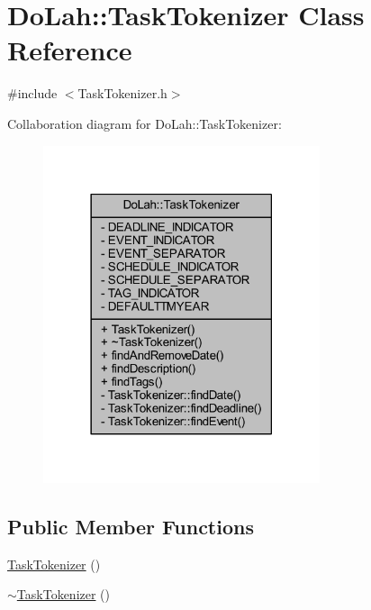 \hypertarget{class_do_lah_1_1_task_tokenizer}{}\section{Do\+Lah\+:\+:Task\+Tokenizer Class Reference}
\label{class_do_lah_1_1_task_tokenizer}


{\ttfamily \#include $<$Task\+Tokenizer.\+h$>$}



Collaboration diagram for Do\+Lah\+:\+:Task\+Tokenizer\+:
\nopagebreak
\begin{figure}[H]
\begin{center}
\leavevmode
\includegraphics[width=230pt]{class_do_lah_1_1_task_tokenizer__coll__graph}
\end{center}
\end{figure}
\subsection*{Public Member Functions}
\begin{DoxyCompactItemize}
\item 
\hyperlink{class_do_lah_1_1_task_tokenizer_a0ad3177a4ddfaf3f1ef0a85101192125}{Task\+Tokenizer} ()
\item 
\hyperlink{class_do_lah_1_1_task_tokenizer_a88463a698aad5e7328b3fe698dda7e9e}{$\sim$\+Task\+Tokenizer} ()
\end{DoxyCompactItemize}

